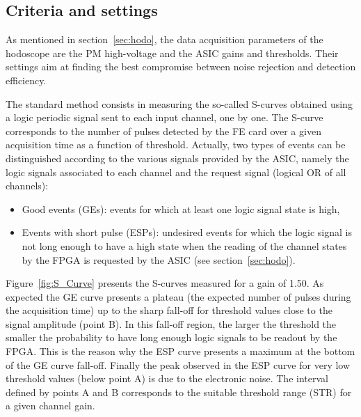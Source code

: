 \documentclass[a4paper,11pt]{article}
\begin{document}
\subsection{Criteria and settings}
\label{sec:Settings}

As mentioned in section~\ref{sec:hodo}, the data acquisition parameters of the hodoscope are the PM high-voltage and the ASIC gains and thresholds. Their settings aim at finding the best compromise between noise rejection and detection efficiency.

The standard method consists in measuring the so-called S-curves obtained using a logic periodic signal sent to each input channel, one by one. The S-curve corresponds to the number of pulses detected by the FE card over a given acquisition time as a function of threshold. Actually, two types of events can be distinguished according to the various signals provided by the ASIC, namely the logic signals associated to each channel and the request signal (logical OR of all channels):
\begin{itemize}
  \item Good events (GEs): events for which at least one logic signal state is high, 
  \item Events with short pulse (ESPs): undesired events for which the logic signal is not long enough to have a high state when the reading of the channel states by the FPGA is requested by the ASIC (see section~\ref{sec:hodo}).
\end{itemize}

Figure~\ref{fig:S_Curve} presents the S-curves measured for a gain of 1.50. As expected the GE curve presents a plateau (the expected number of pulses during the acquisition time) up to the sharp fall-off for threshold values close to the signal amplitude (point B). In this fall-off region, the larger the threshold the smaller the probability to have long enough logic signals to be readout by the FPGA. This is the reason why the ESP curve presents a maximum at the bottom of the GE curve fall-off. Finally the peak observed in the ESP curve for very low threshold values (below point A) is due to the electronic noise. The interval defined by points A and B corresponds to the suitable threshold range (STR) for a given channel gain.
\end{document}
